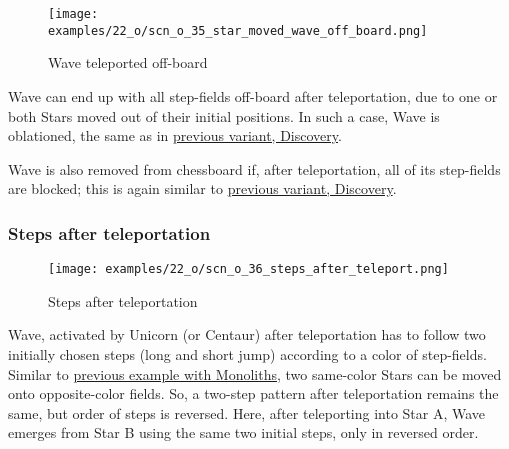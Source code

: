 \clearpage %

\vspace*{-2.1\baselineskip}
\noindent
\begin{figure}[!h]
\texttt{[image: examples/22\_o/scn\_o\_35\_star\_moved\_wave\_off\_board.png]}
\caption{Wave teleported off-board}
\label{fig:scn_o_35_star_moved_wave_off_board}
\end{figure}

Wave can end up with all step-fields off-board after teleportation, due to one or
both Stars moved out of their initial positions. In such a case, Wave is oblationed,
the same as in
\hyperref[fig:scn_d_16_wave_teleported_off_board]{previous variant, Discovery}.

Wave is also removed from chessboard if, after teleportation, all of its step-fields
are blocked; this is again similar to
\hyperref[fig:scn_d_15_teleported_wave_blocked]{previous variant, Discovery}.

\clearpage %

\subsubsection*{Steps after teleportation}
\label{sec:One/Starchild/Activating Wave/Steps after teleportation}

\vspace*{-1.5\baselineskip}
\noindent
\begin{figure}[!h]
\texttt{[image: examples/22\_o/scn\_o\_36\_steps\_after\_teleport.png]}
\vspace*{-1.4\baselineskip}
\caption{Steps after teleportation}
\label{fig:scn_o_36_steps_after_teleport}
\end{figure}

\vspace*{-0.5\baselineskip}
Wave, activated by Unicorn (or Centaur) after teleportation has to follow two initially
chosen steps (long and short jump) according to a color of step-fields. Similar to
\hyperref[fig:scn_d_19_steps_after_teleport_init]{previous example with Monoliths},
two same-color Stars can be moved onto opposite-color fields. So, a two-step pattern
after teleportation remains the same, but order of steps is reversed. Here, after
teleporting into Star A, Wave emerges from Star B using the same two initial steps,
only in reversed order.

